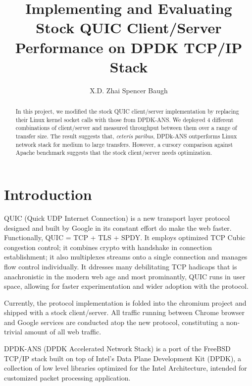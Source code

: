 \documentclass{sig-alternate-05-2015}
\begin{document}
\title{Implementing and Evaluating Stock QUIC Client/Server Performance on DPDK TCP/IP Stack}

\author{
\alignauthor X.D. Zhai
\alignauthor Spencer Baugh 
}

\maketitle
\begin{abstract}
In this project, we modified the stock QUIC client/server implementation by replacing their Linux kernel socket calls with those from DPDK-ANS. We deployed 4 different combinations of client/server and measured throughput between them over a range of transfer size. The result suggests that, \textit{ceteris paribus}, DPDk-ANS outperforms Linux network stack for medium to large transfers. However, a cursory comparison against Apache benchmark suggests that the stock client/server needs optimization.
\end{abstract}

\section{Introduction}
QUIC (Quick UDP Internet Connection) is a new transport layer protocol designed and built by Google in its constant effort do make the web faster. Functionally, QUIC = TCP + TLS + SPDY. It employs optimized TCP Cubic congestion control; it combines crypto with handshake in connection establishment; it also multiplexes streams onto a single connection and manages flow control individually. It ddresses many debilitating TCP hadicaps that is anachronistic in the modern web age and most prominantly, QUIC runs in user space, allowing for faster experimentation and wider adoption with the protocol. 

Currently, the protocol implementation is folded into the chromium project and shipped with a stock client/server. All traffic running between Chrome browser and Google services are conducted atop the new protocol, constituting a non-trivial amount of all web traffic.

DPDK-ANS (DPDK Accelerated Network Stack) is a port of the FreeBSD TCP/IP stack built on top of Intel's Data Plane Development Kit (DPDK), a collection of low level libraries optimized for the Intel Architecture, intended for customized packet processing application. 
\end{document}
